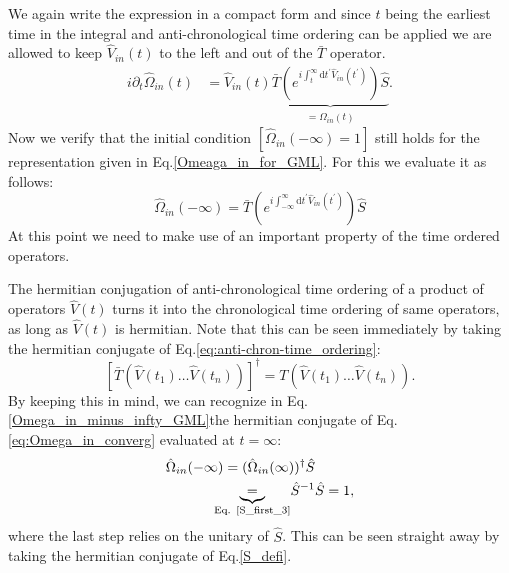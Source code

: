 \documentclass[12pt, titlepage]{article}
\begin{document}
We again write the expression in a compact form and
since $ t $ being the earliest time in the integral and anti-chronological time ordering can be applied we are allowed to keep $ \hat{V}_{in}(t) $ to the left and out of the $ \bar{T} $ operator.
\begin{equation}
\begin{split}
	i\partial_{t}\hat{\Omega}_{in}(t)
	&=\hat{V}_{in}(t)	
\underbrace{	
	\bar{T}
	\left( 
	 e^{i\int_{t}^{\infty}\mathrm{d}t^{\prime} \hat{V}_{in}(t^{\prime})}
	\right)\hat{S}
}_{=\hat{\Omega}_{in}(t)}	
	.
\end{split}
\end{equation}
 Now we verify that the initial condition $\left[  \hat{\Omega}_{in}(-\infty)= 1 \right] $ still holds for the representation given in Eq.\enskip\eqref{Omeaga_in_for_GML}. For this we evaluate it as follows:
\begin{equation}\label{Omega_in_minus_infty_GML}
\hat{\Omega}_{in}(-\infty)
=\bar{T}
	\left( 
	 e^{i\int_{-\infty}^{\infty}\mathrm{d}t^{\prime} \hat{V}_{in}(t^{\prime})}
	\right) \hat{S}
\end{equation}
At this point we need to make use of an important property of the time ordered operators. 

The hermitian conjugation of anti-chronological time ordering of a product of operators $ \hat{V}(t)$ turns it into the chronological time ordering of same operators, as long as $ \hat{V}(t) $ is hermitian. Note that this can be seen immediately by taking the hermitian conjugate of Eq.\enskip\eqref{eq:anti-chron-time_ordering}:
\begin{equation}\label{barT_to_T}
\left[
\bar{T}(\hat{V}(t_{1})\ldots\hat{V}(t_{n}))
\right]^{\dagger}
=T(\hat{V}(t_{1})\ldots\hat{V}(t_{n}))
.
\end{equation}
%
By keeping this in mind, we can recognize in Eq.\enskip\eqref{Omega_in_minus_infty_GML}the hermitian conjugate of Eq.\enskip\eqref{eq:Omega_in_converg} evaluated at $ t=\infty $:
\begin{equation}
\begin{split}
\hat{\Omega}_{in}(-\infty)
&= 	(\hat{\Omega}_{in}(\infty))^{\dagger}\hat{S}
	\\
	&\!\!\!\!\!\underbrace{=}_{\text{Eq.\enskip\eqref{S_first_3}}}\! \hat{S}^{-1}\hat{S}=1,
\end{split}
\end{equation}
where the last step relies on the unitary of $ \hat{S} $. This can be seen straight away  by taking the hermitian conjugate of Eq.\enskip\eqref{S_defi}.
\end{document}
